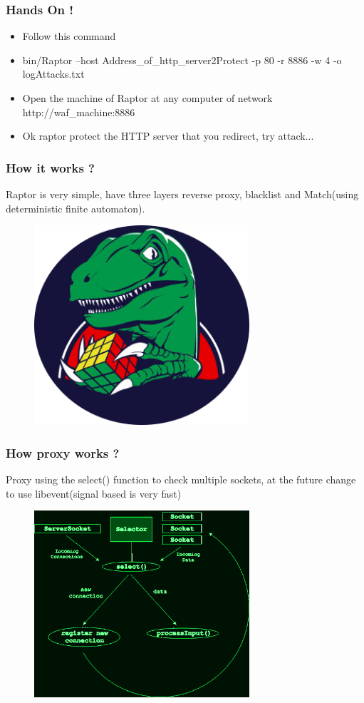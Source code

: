 \documentclass[serif,mathserif]{beamer}
\begin{document}
\begin{frame}
  \frametitle{Hands On !}
  \begin{itemize}
  \item Follow this command
  \item bin/Raptor --host Address\_of\_http\_server2Protect -p 80 -r 8886 -w 4 -o logAttacks.txt 
  \item Open the machine of Raptor at any computer of network http://waf\_machine:8886
  \item Ok raptor protect the HTTP server that you redirect, try attack... 	 
  \end{itemize}
\end{frame}

\begin{frame}
  \frametitle{How it works ?}
   Raptor is very simple, have three layers reverse proxy, blacklist and Match(using deterministic finite automaton).
  \begin{itemize} 
  \begin{figure}[]    
    \centering
    \includegraphics[width=8cm]{images/raptor2.png} 
  \end{figure}
  \end{itemize}
\end{frame}



\begin{frame}
  \frametitle{How proxy works ?}
  Proxy using the select() function to check multiple sockets, at the future change to use libevent(signal based is very fast)  
  \begin{itemize} 
  \begin{figure}[]    
    \centering
    \includegraphics[width=8cm]{images/select.png} 
  \end{figure}
  \end{itemize}
\end{frame}
\end{document}
